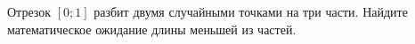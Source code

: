 \documentclass{article}
\begin{document}
Отрезок $[0;1]$ разбит двумя случайными точками на три части. Найдите математическое ожидание длины меньшей из частей.
\end{document}
